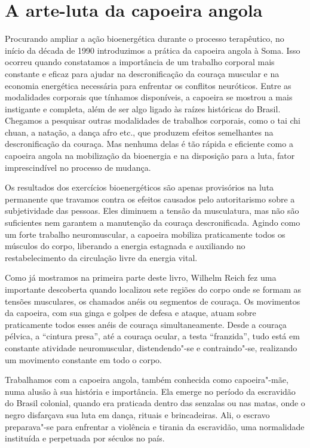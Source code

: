 \section{A arte-luta da capoeira angola}

Procurando ampliar a ação bioenergética durante o processo terapêutico,
no início da década de 1990 introduzimos a prática da capoeira angola à
Soma. Isso ocorreu quando constatamos a importância de um trabalho
corporal mais constante e eficaz para ajudar na descronificação da
couraça muscular e na economia energética necessária para enfrentar os
conflitos neuróticos. Entre as modalidades corporais que tínhamos
disponíveis, a capoeira se mostrou a mais instigante e completa, além de
ser algo ligado às raízes históricas do Brasil. Chegamos a pesquisar
outras modalidades de trabalhos corporais, como o tai chi chuan, a
natação, a dança afro etc., que produzem efeitos semelhantes na
descronificação da couraça. Mas nenhuma delas é tão rápida e eficiente
como a capoeira angola na mobilização da bioenergia e na disposição para
a luta, fator imprescindível no processo de mudança.

Os resultados dos exercícios bioenergéticos são apenas provisórios na
luta permanente que travamos contra os efeitos causados pelo
autoritarismo sobre a subjetividade das pessoas. Eles diminuem a tensão
da musculatura, mas não são suficientes nem garantem a manutenção da
couraça descronificada. Agindo como um forte trabalho neuromuscular, a
capoeira mobiliza praticamente todos os músculos do corpo, liberando a
energia estagnada e auxiliando no restabelecimento da circulação livre
da energia vital.

Como já mostramos na primeira parte deste livro, Wilhelm Reich fez uma
importante descoberta quando localizou sete regiões do corpo onde se
formam as tensões musculares, os chamados anéis ou segmentos de couraça.
Os movimentos da capoeira, com sua ginga e golpes de defesa e ataque,
atuam sobre praticamente todos esses anéis de couraça simultaneamente.
Desde a couraça pélvica, a ``cintura presa'', até a couraça ocular, a
testa ``franzida'', tudo está em constante atividade neuromuscular,
distendendo"-se e contraindo"-se, realizando um movimento constante em
todo o corpo.

Trabalhamos com a capoeira angola, também conhecida como capoeira"-mãe,
numa alusão à sua história e importância. Ela emerge no período da
escravidão do Brasil colonial, quando era praticada dentro das senzalas
ou nas matas, onde o negro disfarçava sua luta em dança, rituais e
brincadeiras. Ali, o escravo preparava"-se para enfrentar a violência e
tirania da escravidão, uma normalidade instituída e perpetuada por
séculos no país.

